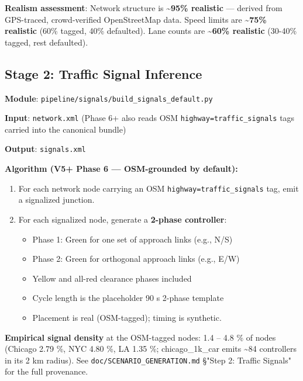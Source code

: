 \textbf{Realism assessment}: Network structure is
\textbf{\textasciitilde95\% realistic} --- derived from GPS-traced,
crowd-verified OpenStreetMap data. Speed limits are
\textbf{\textasciitilde75\% realistic} (60\% tagged, 40\% defaulted).
Lane counts are \textbf{\textasciitilde60\% realistic} (30-40\% tagged,
rest defaulted).

\subsection{Stage 2: Traffic Signal
Inference}\label{333-stage-2-traffic-signal-inference}

\textbf{Module}: \texttt{pipeline/signals/build\_signals\_default.py}

\textbf{Input}: \texttt{network.xml} (Phase 6+ also reads OSM
\texttt{highway=traffic\_signals} tags carried into the canonical
bundle)

\textbf{Output}: \texttt{signals.xml}

\textbf{Algorithm (V5+ Phase 6 --- OSM-grounded by default):}

\begin{enumerate}
\def\labelenumi{\arabic{enumi}.}
\tightlist
\item
  For each network node carrying an OSM
  \texttt{highway=traffic\_signals} tag, emit a signalized junction.
\item
  For each signalized node, generate a \textbf{2-phase controller}:

  \begin{itemize}
  \tightlist
  \item
    Phase 1: Green for one set of approach links (e.g., N/S)
  \item
    Phase 2: Green for orthogonal approach links (e.g., E/W)
  \item
    Yellow and all-red clearance phases included
  \item
    Cycle length is the placeholder 90 s 2-phase template
  \item
    Placement is real (OSM-tagged); timing is synthetic.
  \end{itemize}
\end{enumerate}

\textbf{Empirical signal density} at the OSM-tagged nodes: 1.4 -- 4.8 \%
of nodes (Chicago 2.79 \%, NYC 4.80 \%, LA 1.35 \%; chicago\_1k\_car
emits \textasciitilde84 controllers in its 2 km radius). See
\texttt{doc/SCENARIO\_GENERATION.md} §"Step 2: Traffic Signals" for the
full provenance.

